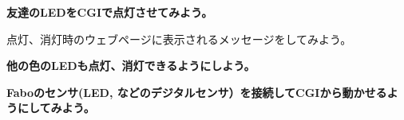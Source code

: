 \bigskip


\bigskip
{}\theQuestion

{\bfseries
	友達のLEDをCGIで点灯させてみよう。}

{\bfseries

	点灯、消灯時のウェブページに表示されるメッセージをしてみよう。}

{\bfseries
	他の色のLEDも点灯、消灯できるようにしよう。}

{\bfseries
	Faboのセンサ(LED,
	などのデジタルセンサ）を接続してCGIから動かせるようにしてみよう。}


\bigskip